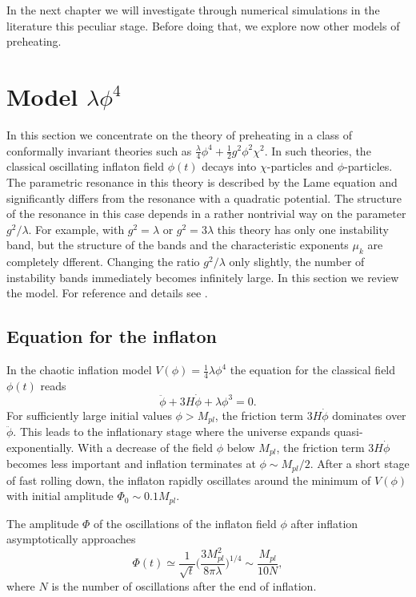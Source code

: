 \documentclass[11pt,a4paper,twoside]{book}
\begin{document}
 In the next chapter we will investigate through numerical simulations in the literature this peculiar stage. Before doing that, we explore now other models of preheating.

 \section{Model $\lambda \phi^{4}$}
 In this section we concentrate on the theory of preheating in a class of conformally invariant theories such as $ \frac{\lambda}{4} \phi^{4} + \frac{1}{2}g^{2}\phi^{2}\chi^{2} $. In such theories, the classical oscillating inflaton field $\phi(t)$ decays into $\chi$-particles and $\phi$-particles. The parametric resonance in this theory is described by the Lame equation and significantly differs from the resonance with a quadratic potential. The structure of the resonance in this case depends in a rather nontrivial way on the parameter $ g^{2}/\lambda $. For example,  with $ g^{2}=\lambda $ or $ g^{2}=3\lambda $ this theory has only one instability band, but the structure of the bands and the characteristic exponents $\mu_{k}$ are completely dfferent. Changing the ratio $ g^{2}/\lambda $ only slightly, the number of instability bands immediately becomes infinitely large.
 In this section we review the model. For reference and details see \cite{Chap4:ModelLambdaPhi4Reference}.
 
\subsection{Equation for the inflaton}
In the chaotic inflation model $ V(\phi)=\frac{1}{4} \lambda \phi^{4}$ the equation for the classical field $\phi(t)$ reads
\begin{equation}
\label{Chap4:lambdaPhi4_eomPhi4}
\ddot{\phi} + 3H\dot{\phi} + \lambda \phi^{3}=0.
\end{equation}
 For sufficiently large initial values $\phi > M_{pl}$, the friction term $ 3H\dot{\phi} $ dominates over $\ddot{\phi}$. This leads to the inflationary stage where the universe expands quasi-exponentially. With a decrease of the field $\phi$ below $ M_{pl} $, the friction term $ 3H\dot{\phi} $ becomes less important and inflation terminates at $ \phi \sim M_{pl}/2 $. After a short stage of fast rolling down, the inflaton rapidly oscillates around  the minimum of $ V(\phi) $ with  initial amplitude $ \Phi_{0} \sim 0.1 M_{pl} $.
 
 The amplitude $\Phi$ of the oscillations of the inflaton field $\phi$ after inflation asymptotically approaches
 \begin{equation}
\label{Chap4:lambdaPhi4_inflaton}
\Phi(t) \simeq \frac{1}{\sqrt{t}}\Bigg(\frac{3M_{pl}^{2}}{8\pi \lambda}\Bigg)^{1/4} \sim \frac{M_{pl}}{10N},
 \end{equation}
 where $ N $ is the number of oscillations after the end of inflation.
 
\end{document}
